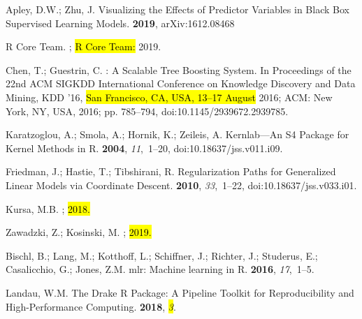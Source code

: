 \documentclass[remotesensing,article,accept,moreauthors,pdftex]{Definitions/mdpi}
\begin{document}
\begin{thebibliography}{999}
Apley, D.W.; Zhu, J.
\newblock Visualizing the {{Effects}} of {{Predictor Variables}} in {{Black Box
  Supervised Learning Models}}.
 {\bf 2019}, arXiv:1612.08468

{R Core Team}.
;  \hl{R Core Team:} 2019.

Chen, T.; Guestrin, C.
: A {{Scalable Tree Boosting System}}.
\newblock  In Proceedings of the {{22nd ACM SIGKDD International Conference}} on
  {{Knowledge Discovery}} and {{Data Mining}}, {{KDD}} '16, \hl{San Francisco, CA, USA, 13--17 August} 2016; {ACM}: {New York, NY, USA},
  2016; pp. 785--794, doi:10.1145/2939672.2939785.

Karatzoglou, A.; Smola, A.; Hornik, K.; Zeileis, A.
\newblock Kernlab---{{An S4 Package}} for {{Kernel Methods}} in {{R}}.
 {\bf 2004}, {\em 11},~1--20, doi:10.18637/jss.v011.i09.

Friedman, J.; Hastie, T.; Tibshirani, R.
\newblock Regularization Paths for Generalized Linear Models via Coordinate
  Descent.
 {\bf 2010}, {\em 33},~1--22, doi:10.18637/jss.v033.i01.

Kursa, M.B.
;  \hl{2018.}

Zawadzki, Z.; Kosinski, M.
;  \hl{2019.}

Bischl, B.; Lang, M.; Kotthoff, L.; Schiffner, J.; Richter, J.; Studerus, E.;
  Casalicchio, G.; Jones, Z.M.
\newblock mlr: Machine learning in {R}.
 {\bf 2016}, {\em
  17},~1--5.

Landau, W.M.
\newblock The Drake {{R}} Package: A Pipeline Toolkit for Reproducibility and
  High-Performance Computing.
 {\bf 2018}, {\em \hl{3}}.


\end{thebibliography}
\end{document}
